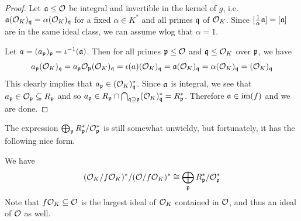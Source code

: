 \begin{proof}
    Let $\a \leq \O$ be integral and invertible in the kernel of $g$, i.e. $\a(\O_K)_\q = \alpha(\O_K)_\q$ for a fixed $\alpha \in K^*$ and all primes $\q$ of $\O_K$.
    Since $[\frac 1 \alpha \a] = [\a]$ are in the same ideal class, we can assume wlog that $\alpha = 1$.

    Let $a = (a_\p)_\p = \iota^{-1}(\a)$.
    Then for all primes $\p \leq \O$ and $\q \leq \O_K$ over $\p$, we have
    \begin{equation*}
        a_\p (\O_K)_\q = a_\p \O_\p (\O_K)_\q = \iota(a) (\O_K)_\q = \a (\O_K)_\q = \alpha (\O_K)_\q = (\O_K)_\q
    \end{equation*}
    This clearly implies that $a_\p \in (\O_K)_\q^*$.
    Since $\a$ is integral, we see that $a_\p \in \O_\p \subseteq R_\p$ and so $a_\p \in R_\p \cap \bigcap_{\q \supseteq \p} (\O_K)_\q^* = R_\p^*$.
    Therefore $\a \in \mathrm{im}(f)$ and we are done.
\end{proof}
The expression $\bigoplus_\p R_\p^*/\O_\p^*$ is still somewhat unwieldy, but fortunately, it has the following nice form.
\begin{lemma}
    We have
    \begin{equation*}
        (\O_K/f\O_K)^*/(\O/f\O_K)^* \cong \bigoplus_\p R_\p^*/\O_\p^*
    \end{equation*}
    Note that $f\O_K \subseteq \O$ is the largest ideal of $\O_K$ contained in $\O$, and thus an ideal of $\O$ as well.
\end{lemma}
